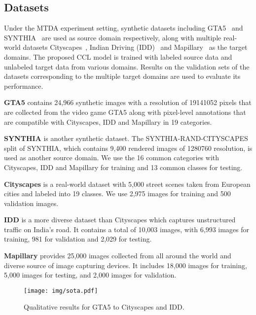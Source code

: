 \subsection{Datasets}




Under the MTDA experiment setting, synthetic datasets including GTA5~\cite{richter2016playing} and SYNTHIA~\cite{ros2016synthia} are used as source domain respectively, along with multiple real-world datasets Cityscapes~\cite{cordts2016cityscapes}, Indian Driving (IDD)~\cite{varma2019idd} and Mapillary~\cite{neuhold2017mapillary} as the target domains. The proposed CCL model is trained with labeled source data and unlabeled target data from various domains. Results on the validation sets of the datasets corresponding to the multiple target domains are used to evaluate its performance.

\textbf{GTA5} contains 24,966 synthetic images with a resolution of 19141052 pixels that are collected from the video game GTA5 along with pixel-level annotations that are compatible with Cityscapes, IDD and Mapillary in 19 categories.

\textbf{SYNTHIA} is another synthetic dataset. The SYNTHIA-RAND-CITYSCAPES split of SYNTHIA, which contains 9,400 rendered images of 1280760 resolution, is used as another source domain. We use the 16 common categories with Cityscapes, IDD and Mapillary for training and 13 common classes for testing.

\textbf{Cityscapes} is a real-world dataset with 5,000 street scenes taken from European cities and labeled into 19 classes. We use 2,975 images for training and 500 validation images. 

\textbf{IDD} is a more diverse dataset than Cityscapes which captures unstructured traffic on India’s road. It contains a total of 10,003 images, with 6,993 images for training, 981 for validation and 2,029 for testing.

\textbf{Mapillary} provides 25,000 images collected from all around the world and diverse source of image capturing devices. It includes 18,000 images for training, 5,000 images for testing, and 2,000 images for validation. 

\begin{figure*}[t]
	\begin{center}
\texttt{[image: img/sota.pdf]}
	\end{center}
	\label{fig:target_semantic}
	\caption{Qualitative results for GTA5 to Cityscapes and IDD.}
	\vspace{-3mm}
	\label{figure:sota}
\end{figure*}















